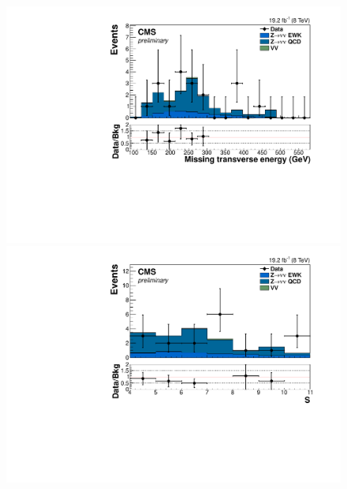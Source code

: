 \begin{figure}
  \includegraphics[width=.65\largefigwidth]{plots/parked/HIG-14-038-figs/output_sigreg/mumu_metnomuons.pdf}
  \includegraphics[width=.65\largefigwidth]{plots/parked/HIG-14-038-figs/output_sigreg/mumu_metnomu_significance.pdf}


\end{figure}
